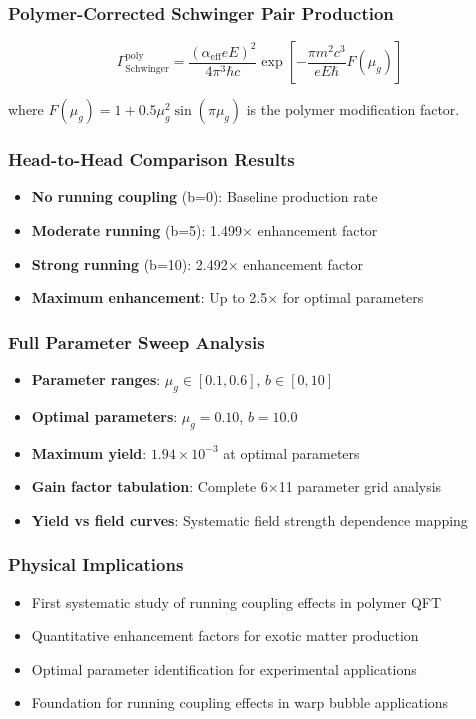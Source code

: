 \documentclass[11pt]{article}
\begin{document}
\subsubsection{Polymer-Corrected Schwinger Pair Production}
\begin{equation}
\Gamma_{\text{Schwinger}}^{\text{poly}} = \frac{(\alpha_{\text{eff}} eE)^2}{4\pi^3\hbar c} \exp\left[-\frac{\pi m^2c^3}{eE\hbar}F(\mu_g)\right]
\end{equation}

where $F(\mu_g) = 1 + 0.5\mu_g^2\sin(\pi\mu_g)$ is the polymer modification factor.

\subsubsection{Head-to-Head Comparison Results}
\begin{itemize}
    \item \textbf{No running coupling} (b=0): Baseline production rate
    \item \textbf{Moderate running} (b=5): 1.499× enhancement factor
    \item \textbf{Strong running} (b=10): 2.492× enhancement factor
    \item \textbf{Maximum enhancement}: Up to 2.5× for optimal parameters
\end{itemize}

\subsubsection{Full Parameter Sweep Analysis}
\begin{itemize}
    \item \textbf{Parameter ranges}: $\mu_g \in [0.1, 0.6]$, $b \in [0, 10]$
    \item \textbf{Optimal parameters}: $\mu_g = 0.10$, $b = 10.0$
    \item \textbf{Maximum yield}: $1.94 \times 10^{-3}$ at optimal parameters
    \item \textbf{Gain factor tabulation}: Complete 6×11 parameter grid analysis
    \item \textbf{Yield vs field curves}: Systematic field strength dependence mapping
\end{itemize}

\subsubsection{Physical Implications}
\begin{itemize}
    \item First systematic study of running coupling effects in polymer QFT
    \item Quantitative enhancement factors for exotic matter production
    \item Optimal parameter identification for experimental applications
    \item Foundation for running coupling effects in warp bubble applications
\end{itemize}
\end{document}
